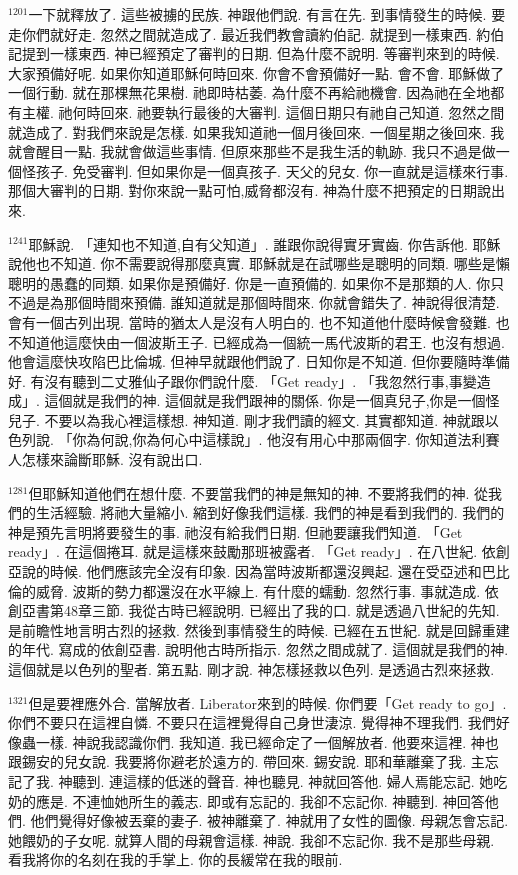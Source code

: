 \documentclass{book}
\begin{document}
$^{1201}$一下就釋放了.
這些被擄的民族.
神跟他們說.
有言在先.
到事情發生的時候.
要走你們就好走.
忽然之間就造成了.
最近我們教會讀約伯記.
就提到一樣東西.
約伯記提到一樣東西.
神已經預定了審判的日期.
但為什麼不說明.
等審判來到的時候.
大家預備好呢.
如果你知道耶穌何時回來.
你會不會預備好一點.
會不會.
耶穌做了一個行動.
就在那棵無花果樹.
祂即時枯萎.
為什麼不再給祂機會.
因為祂在全地都有主權.
祂何時回來.
祂要執行最後的大審判.
這個日期只有祂自己知道.
忽然之間就造成了.
對我們來說是怎樣.
如果我知道祂一個月後回來.
一個星期之後回來.
我就會醒目一點.
我就會做這些事情.
但原來那些不是我生活的軌跡.
我只不過是做一個怪孩子.
免受審判.
但如果你是一個真孩子.
天父的兒女.
你一直就是這樣來行事.
那個大審判的日期.
對你來說一點可怕,威脅都沒有.
神為什麼不把預定的日期說出來.

$^{1241}$耶穌說.
「連知也不知道,自有父知道」.
誰跟你說得實牙實齒.
你告訴他.
耶穌說他也不知道.
你不需要說得那麼真實.
耶穌就是在試哪些是聰明的同類.
哪些是懶聰明的愚蠢的同類.
如果你是預備好.
你是一直預備的.
如果你不是那類的人.
你只不過是為那個時間來預備.
誰知道就是那個時間來.
你就會錯失了.
神說得很清楚.
會有一個古列出現.
當時的猶太人是沒有人明白的.
也不知道他什麼時候會發難.
也不知道他這麼快由一個波斯王子.
已經成為一個統一馬代波斯的君王.
也沒有想過.
他會這麼快攻陷巴比倫城.
但神早就跟他們說了.
日知你是不知道.
但你要隨時準備好.
有沒有聽到二丈雅仙子跟你們說什麼.
「Get ready」.
「我忽然行事,事變造成」.
這個就是我們的神.
這個就是我們跟神的關係.
你是一個真兒子,你是一個怪兒子.
不要以為我心裡這樣想.
神知道.
剛才我們讀的經文.
其實都知道.
神就跟以色列說.
「你為何說,你為何心中這樣說」.
他沒有用心中那兩個字.
你知道法利賽人怎樣來論斷耶穌.
沒有說出口.

$^{1281}$但耶穌知道他們在想什麼.
不要當我們的神是無知的神.
不要將我們的神.
從我們的生活經驗.
將祂大量縮小.
縮到好像我們這樣.
我們的神是看到我們的.
我們的神是預先言明將要發生的事.
祂沒有給我們日期.
但祂要讓我們知道.
「Get ready」.
在這個捲耳.
就是這樣來鼓勵那班被露者.
「Get ready」.
在八世紀.
依創亞說的時候.
他們應該完全沒有印象.
因為當時波斯都還沒興起.
還在受亞述和巴比倫的威脅.
波斯的勢力都還沒在水平線上.
有什麼的蠕動.
忽然行事.
事就造成.
依創亞書第48章三節.
我從古時已經說明.
已經出了我的口.
就是透過八世紀的先知.
是前瞻性地言明古烈的拯救.
然後到事情發生的時候.
已經在五世紀.
就是回歸重建的年代.
寫成的依創亞書.
說明他古時所指示.
忽然之間成就了.
這個就是我們的神.
這個就是以色列的聖者.
第五點.
剛才說.
神怎樣拯救以色列.
是透過古烈來拯救.

$^{1321}$但是要裡應外合.
當解放者.
Liberator來到的時候.
你們要「Get ready to go」.
你們不要只在這裡自憐.
不要只在這裡覺得自己身世淒涼.
覺得神不理我們.
我們好像蟲一樣.
神說我認識你們.
我知道.
我已經命定了一個解放者.
他要來這裡.
神也跟錫安的兒女說.
我要將你避老於遠方的.
帶回來.
錫安說.
耶和華離棄了我.
主忘記了我.
神聽到.
連這樣的低迷的聲音.
神也聽見.
神就回答他.
婦人焉能忘記.
她吃奶的應是.
不連恤她所生的義志.
即或有忘記的.
我卻不忘記你.
神聽到.
神回答他們.
他們覺得好像被丟棄的妻子.
被神離棄了.
神就用了女性的圖像.
母親怎會忘記.
她餵奶的子女呢.
就算人間的母親會這樣.
神說.
我卻不忘記你.
我不是那些母親.
看我將你的名刻在我的手掌上.
你的長緩常在我的眼前.
\end{document}

